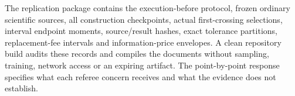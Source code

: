 \documentclass[ecta,nameyear,draft]{econsocart}
\begin{document}
The replication package contains the execution-before protocol, frozen ordinary scientific sources, all construction checkpoints, actual first-crossing selections, interval endpoint moments, source/result hashes, exact tolerance partitions, replacement-fee intervals and information-price envelopes. A clean repository build audits these records and compiles the documents without sampling, training, network access or an expiring artifact. The point-by-point response specifies what each referee concern receives and what the evidence does not establish.


\end{document}
